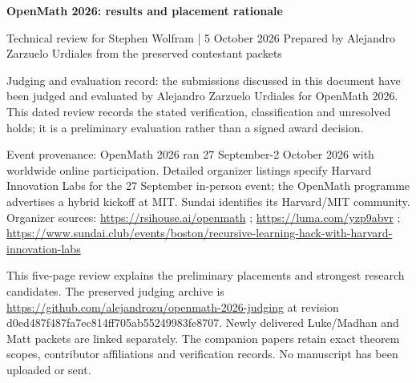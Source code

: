 \documentclass[10pt,a4paper]{article}
\begin{document}
{\LARGE\bfseries OpenMath 2026: results and placement rationale\par}\medskip
{\small Technical review for Stephen Wolfram | 5 October 2026
Prepared by Alejandro Zarzuelo Urdiales from the preserved contestant packets\par}\medskip
{\small Judging and evaluation record: the submissions discussed in this document have been judged and evaluated by Alejandro Zarzuelo Urdiales for OpenMath 2026. This dated review records the stated verification, classification and unresolved holds; it is a preliminary evaluation rather than a signed award decision.\par}

{\small Event provenance: OpenMath 2026 ran 27 September-2 October 2026 with worldwide online participation. Detailed organizer listings specify Harvard Innovation Labs for the 27 September in-person event; the OpenMath programme advertises a hybrid kickoff at MIT. Sundai identifies its Harvard/MIT community. Organizer sources: \url{https://rsihouse.ai/openmath} ; \url{https://luma.com/yzp9abvr} ; \url{https://www.sundai.club/events/boston/recursive-learning-hack-with-harvard-innovation-labs}\par}

This five-page review explains the preliminary placements and strongest research candidates. The preserved judging archive is \url{https://github.com/alejandrozu/openmath-2026-judging} at revision d0ed487f487fa7ec814ff705ab55249983fe8707. Newly delivered Luke/Madhan and Matt packets are linked separately. The companion papers retain exact theorem scopes, contributor affiliations and verification records. No manuscript has been uploaded or sent.
\end{document}
